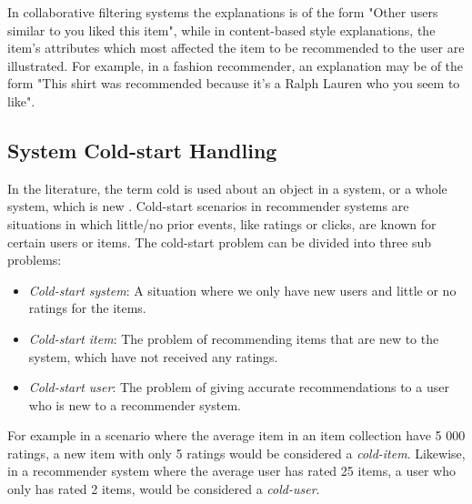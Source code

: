In collaborative filtering systems the explanations is of the form "Other users
similar to you liked this item", while in content-based style explanations, the
item's attributes which most affected the item to be recommended to the user
are illustrated. For example, in a fashion recommender, an explanation may be
of the form "This shirt was recommended because it's a Ralph Lauren who you
seem to like".

\subsection{System Cold-start Handling}


In the literature, the term cold is used about an object in a system, or a
whole system, which is new \cite{Schein2002, Park2006}. Cold-start scenarios in recommender systems are
situations in which little/no prior events, like ratings or clicks, are known
for certain users or items. The cold-start problem can be divided into three sub problems:

\begin{itemize}
  \item \emph{Cold-start system}: A situation where we only have new users and
  little or no ratings for the items.

  \item \emph{Cold-start item}: The problem of recommending items that are new
  to the system, which have not received any ratings.

  \item \emph{Cold-start user}: The problem of giving accurate recommendations
  to a user who is new to a recommender system.
\end{itemize}


For example in a scenario where the average item in an item collection have 5
000 ratings, a new item with only 5 ratings would be considered a
\emph{cold-item}. Likewise, in a recommender system where the average user has
rated 25 items, a user who only has rated 2 items, would be considered a
\emph{cold-user}.


